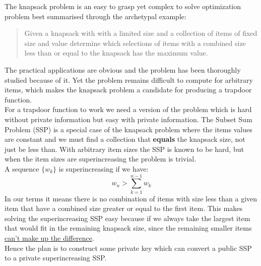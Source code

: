 
The knapsack problem is an easy to grasp yet complex to solve optimization problem best summarised through the archetypal example:

\begin{quote}
Given a knapsack with with a limited size and a collection of items of fixed size and value determine which selections of items with a combined size less than or equal to the knapsack has the maximum value.
\end{quote}

The practical applications are obvious and the problem has been thoroughly studied because of it.
Yet the problem remains difficult to compute for arbitrary items,
which makes the knapsack problem a candidate for producing a trapdoor function.
\\

For a trapdoor function to work we need a version of the problem which is hard without private information but easy with private information.
The Subset Sum Problem (SSP) is a special case of the knapsack problem where the items values are constant and we must find a collection that {\bf equals} the knapsack size, not just be less than.
With arbitrary item sizes the SSP is known to be hard,
but when the item sizes are superincreasing the problem is trivial.
\\

A sequence $\{w_k\}$ is superincreasing if we have:
\[w_n > \sum_{k=1}^{n-1}w_k\]
In our terms it means there is no combination of items with size less than a given item that have a combined size greater or equal to the first item.
This makes solving the superincreasing SSP easy because if we always take the largest item that would fit in the remaining knapsack size, since the remaining smaller items \hyperref[appx:SSP]{can't make up the difference}.
\\

Hence the plan is to construct some private key which can convert a public SSP to a private superincreasing SSP.
